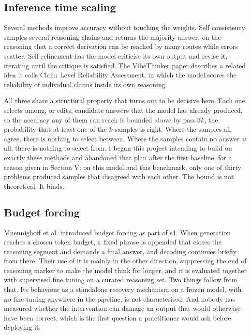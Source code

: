 \documentclass[conference]{IEEEtran}
\begin{document}
\subsection{Inference time scaling}

Several methods improve accuracy without touching the weights. Self consistency
\cite{selfconsistency} samples several reasoning chains and returns the majority
answer, on the reasoning that a correct derivation can be reached by many routes
while errors scatter. Self refinement \cite{selfrefine} has the model criticise
its own output and revise it, iterating until the critique is satisfied. The
VibeThinker paper describes a related idea it calls Claim Level Reliability
Assessment, in which the model scores the reliability of individual claims inside
its own reasoning.

All three share a structural property that turns out to be decisive here. Each
one selects among, or edits, candidate answers that the model has already
produced, so the accuracy any of them can reach is bounded above by pass@$k$, the
probability that at least one of the $k$ samples is right. Where the samples all
agree, there is nothing to select between. Where the samples contain no answer at
all, there is nothing to select from. I began this project intending to build on
exactly these methods and abandoned that plan after the first baseline, for a
reason given in Section V: on this model and this benchmark, only one of thirty
problems produced samples that disagreed with each other. The bound is not
theoretical. It binds.

\subsection{Budget forcing}

Muennighoff et al. \cite{s1} introduced budget forcing as part of s1. When
generation reaches a chosen token budget, a fixed phrase is appended that closes
the reasoning segment and demands a final answer, and decoding continues briefly
from there. Their use of it is mainly in the other direction, suppressing the end
of reasoning marker to make the model think for longer, and it is evaluated
together with supervised fine tuning on a curated reasoning set. Two things
follow from that. Its behaviour as a standalone recovery mechanism on a frozen
model, with no fine tuning anywhere in the pipeline, is not characterised. And
nobody has measured whether the intervention can damage an output that would
otherwise have been correct, which is the first question a practitioner would ask
before deploying it.
\end{document}
